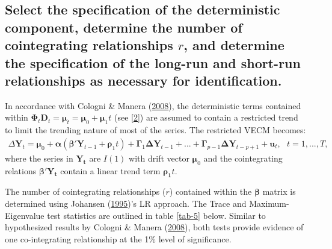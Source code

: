 \documentclass[11pt,preprint, authoryear]{elsarticle}
\numberwithin{equation}{section}
\numberwithin{figure}{section}
\numberwithin{table}{section}
\begin{document}
\hypertarget{select-the-specification-of-the-deterministic-component-determine-the-number-of-cointegrating-relationships-r-and-determine-the-specification-of-the-long-run-and-short-run-relationships-as-necessary-for-identification.}{%
\subsection{\texorpdfstring{Select the specification of the
deterministic component, determine the number of cointegrating
relationships \(r\), and determine the specification of the long-run and
short-run relationships as necessary for identification.
\label{step3}}{Select the specification of the deterministic component, determine the number of cointegrating relationships r, and determine the specification of the long-run and short-run relationships as necessary for identification. }}\label{select-the-specification-of-the-deterministic-component-determine-the-number-of-cointegrating-relationships-r-and-determine-the-specification-of-the-long-run-and-short-run-relationships-as-necessary-for-identification.}}

In accordance with Cologni \& Manera
(\protect\hyperlink{ref-cologni2008}{2008}), the deterministic terms
contained within
\(\bm{\Phi}_t \bm{D}_t= \bm{\mu}_t = \bm{\mu}_0 + \bm{\mu}_1 t\) (see
\ref{2}) are assumed to contain a restricted trend to limit the trending
nature of most of the series. The restricted VECM becomes: \begin{align}
\Delta \bm{Y}_t = \bm{\mu}_0 + \bm{\alpha}(\bm{\beta}'\bm{Y}_{t-1} + \bm{\rho}_1 t) +  \bm{\Gamma}_1 \bm{\Delta Y}_{t-1} + ... + \bm{\Gamma}_{p-1} \bm{\Delta} \bm{Y}_{t-p+1} + \bm{u}_t, \ \ \ t=1,...,T, \label{10}
\end{align} where the series in \(\bm{Y_t}\) are \(I(1)\) with drift
vector \(\bm{\mu}_0\) and the cointegrating relations
\(\bm{\beta' Y_t}\) contain a linear trend term \(\bm{\rho_1} t\).

The number of cointegrating relationships (\(r\)) contained within the
\(\bm{\beta}\) matrix is determined using Johansen
(\protect\hyperlink{ref-johansen1995}{1995})'s LR approach. The Trace
and Maximum-Eigenvalue test statistics are outlined in table \ref{tab-5}
below. Similar to hypothesized results by Cologni \& Manera
(\protect\hyperlink{ref-cologni2008}{2008}), both tests provide evidence
of one co-integrating relationship at the 1\% level of significance.\\
\end{document}
